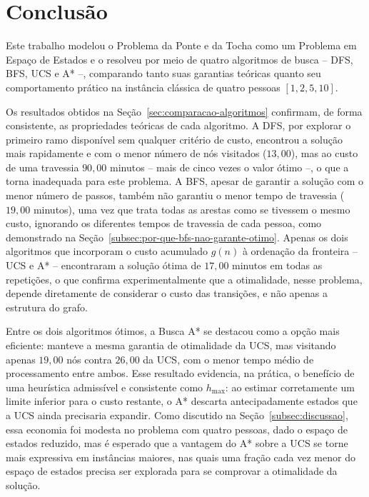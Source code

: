 \section{Conclusão}
\label{sec:conclusao}

Este trabalho modelou o Problema da Ponte e da Tocha como um Problema em
Espaço de Estados e o resolveu por meio de quatro algoritmos de busca --
DFS, BFS, UCS e A* --, comparando tanto suas garantias teóricas quanto seu
comportamento prático na instância clássica de quatro pessoas
$[1, 2, 5, 10]$.

Os resultados obtidos na Seção~\ref{sec:comparacao-algoritmos} confirmam,
de forma consistente, as propriedades teóricas de cada algoritmo. A DFS,
por explorar o primeiro ramo disponível sem qualquer critério de custo,
encontrou a solução mais rapidamente e com o menor número de nós visitados
($13{,}00$), mas ao custo de uma travessia $90{,}00$ minutos -- mais de
cinco vezes o valor ótimo --, o que a torna inadequada para este problema.
A BFS, apesar de garantir a solução com o menor número de passos, também
não garantiu o menor tempo de travessia ($19{,}00$ minutos), uma vez que
trata todas as arestas como se tivessem o mesmo custo, ignorando os
diferentes tempos de travessia de cada pessoa, como demonstrado na
Seção~\ref{subsec:por-que-bfs-nao-garante-otimo}. Apenas os dois
algoritmos que incorporam o custo acumulado $g(n)$ à ordenação da
fronteira -- UCS e A* -- encontraram a solução ótima de $17{,}00$ minutos
em todas as repetições, o que confirma experimentalmente que a
otimalidade, nesse problema, depende diretamente de considerar o custo das
transições, e não apenas a estrutura do grafo.

Entre os dois algoritmos ótimos, a Busca A* se destacou como a opção mais
eficiente: manteve a mesma garantia de otimalidade da UCS, mas visitando
apenas $19{,}00$ nós contra $26{,}00$ da UCS, com o menor tempo médio de
processamento entre ambos. Esse resultado evidencia, na prática, o
benefício de uma heurística admissível e consistente como $h_{\max}$: ao
estimar corretamente um limite inferior para o custo restante, o A*
descarta antecipadamente estados que a UCS ainda precisaria expandir. Como
discutido na Seção~\ref{subsec:discussao}, essa economia foi modesta no
problema com quatro pessoas, dado o espaço de estados reduzido, mas é
esperado que a vantagem do A* sobre a UCS se torne mais expressiva em
instâncias maiores, nas quais uma fração cada vez menor do espaço de
estados precisa ser explorada para se comprovar a otimalidade da solução.

